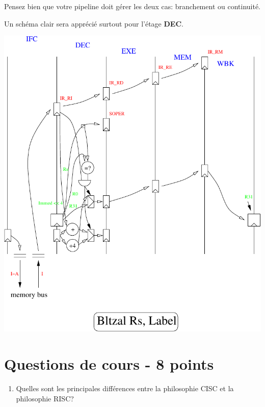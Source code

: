 {Pensez bien que votre pipeline doit g\'erer les deux cas: branchement
ou continuit\'e.

Un sch\'ema clair sera appr\'eci\'e surtout pour l'\'etage \textbf{DEC}.

\begin{correction}

  \begin{center}
    \includegraphics[scale=0.8]{figures/correction-vue-detaillee.pdf}
  \end{center}

\end{correction}

%
%

\section{Questions de cours - 8 points}

\begin{enumerate}
  \item
    Quelles sont les principales diff\'erences entre la philosophie CISC
    et la philosophie RISC?


\end{enumerate}}
